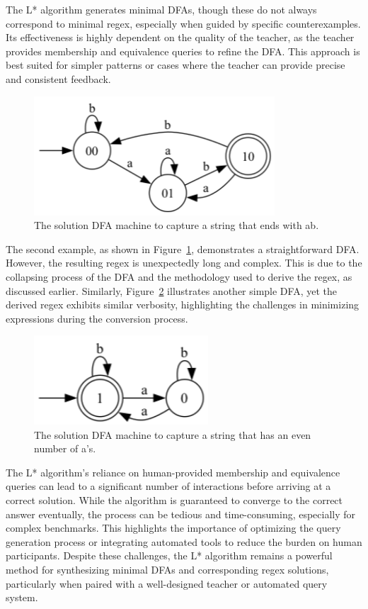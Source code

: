 The L* algorithm generates minimal DFAs, though these do not always correspond to minimal regex, especially when guided by specific counterexamples. Its effectiveness is highly dependent on the quality of the teacher, as the teacher provides membership and equivalence queries to refine the DFA. This approach is best suited for simpler patterns or cases where the teacher can provide precise and consistent feedback.

\begin{figure}[h!]
	\centering
	\includegraphics[width=9cm]{figures/ends_with_ab.png}
	\caption{The solution DFA machine to capture a string that ends with ab.}
	\label{fig:ends_with_ab}
\end{figure}

The second example, as shown in Figure~\ref{fig:ends_with_ab}, demonstrates a straightforward DFA. However, the resulting regex is unexpectedly long and complex. This is due to the collapsing process of the DFA and the methodology used to derive the regex, as discussed earlier. Similarly, Figure~\ref{fig:even_a} illustrates another simple DFA, yet the derived regex exhibits similar verbosity, highlighting the challenges in minimizing expressions during the conversion process.

\begin{figure}[h!]
	\centering
	\includegraphics[width=6.5cm]{figures/even_a.png}
	\caption{The solution DFA machine to capture a string that has an even number of a's.}
	\label{fig:even_a}
\end{figure}

\indent\indent The L* algorithm's reliance on human-provided membership and equivalence queries can lead to a significant number of interactions before arriving at a correct solution. While the algorithm is guaranteed to converge to the correct answer eventually, the process can be tedious and time-consuming, especially for complex benchmarks. This highlights the importance of optimizing the query generation process or integrating automated tools to reduce the burden on human participants. Despite these challenges, the L* algorithm remains a powerful method for synthesizing minimal DFAs and corresponding regex solutions, particularly when paired with a well-designed teacher or automated query system.

